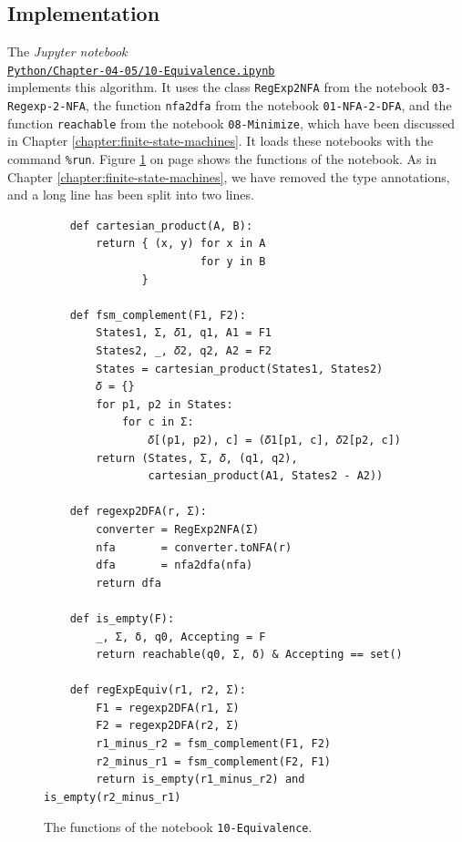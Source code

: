 \subsection{Implementation}
The \textsl{Jupyter notebook}
\\[0.2cm]
\hspace*{1.3cm}
\href{https://github.com/karlstroetmann/Formal-Languages/blob/master/Python/Chapter-04-05/10-Equivalence.ipynb}{\texttt{Python/Chapter-04-05/10-Equivalence.ipynb}}
\\[0.2cm]
implements this algorithm.  It uses the class \texttt{RegExp2NFA} from the notebook \texttt{03-Regexp-2-NFA}, the
function \texttt{nfa2dfa} from the notebook \texttt{01-NFA-2-DFA}, and the function \texttt{reachable} from the
notebook \texttt{08-Minimize}, which have been discussed in Chapter \ref{chapter:finite-state-machines}.  It loads
these notebooks with the command \texttt{\%run}.  Figure \ref{fig:10-Equivalence.ipynb:regExpEquiv} on page
\pageref{fig:10-Equivalence.ipynb:regExpEquiv} shows the functions of the notebook.  As in Chapter
\ref{chapter:finite-state-machines}, we have removed the type annotations, and a long line has been split into two
lines.

\begin{figure}[!ht]
\centering
\begin{verbatim}
    def cartesian_product(A, B):
        return { (x, y) for x in A
                        for y in B
               }

    def fsm_complement(F1, F2):
        States1, Σ, 𝛿1, q1, A1 = F1
        States2, _, 𝛿2, q2, A2 = F2
        States = cartesian_product(States1, States2)
        𝛿 = {}
        for p1, p2 in States:
            for c in Σ:
                𝛿[(p1, p2), c] = (𝛿1[p1, c], 𝛿2[p2, c])
        return (States, Σ, 𝛿, (q1, q2),
                cartesian_product(A1, States2 - A2))

    def regexp2DFA(r, Σ):
        converter = RegExp2NFA(Σ)
        nfa       = converter.toNFA(r)
        dfa       = nfa2dfa(nfa)
        return dfa

    def is_empty(F):
        _, Σ, δ, q0, Accepting = F
        return reachable(q0, Σ, δ) & Accepting == set()

    def regExpEquiv(r1, r2, Σ):
        F1 = regexp2DFA(r1, Σ)
        F2 = regexp2DFA(r2, Σ)
        r1_minus_r2 = fsm_complement(F1, F2)
        r2_minus_r1 = fsm_complement(F2, F1)
        return is_empty(r1_minus_r2) and is_empty(r2_minus_r1)
\end{verbatim}
\vspace*{-0.3cm}
\caption{The functions of the notebook \texttt{10-Equivalence}.}
\label{fig:10-Equivalence.ipynb:regExpEquiv}
\end{figure}

